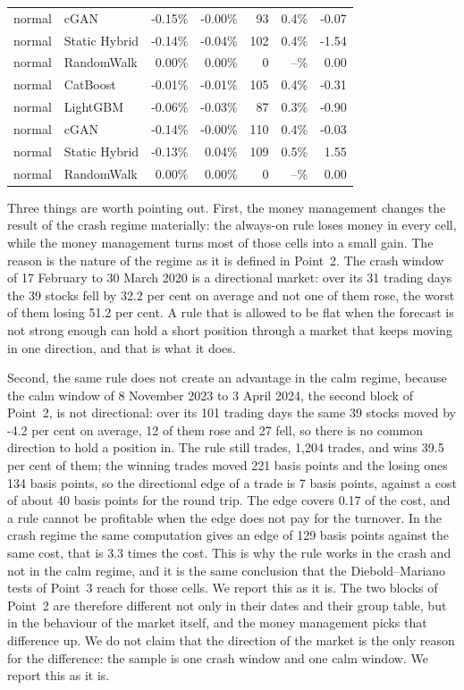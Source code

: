 \documentclass[11pt,a4paper]{article}
\begin{document}
\begin{center}
\begin{longtable}{llrrrrr}
normal & cGAN & -0.15\% & -0.00\% & 93 & 0.4\% & -0.07 \\
normal & Static Hybrid & -0.14\% & -0.04\% & 102 & 0.4\% & -1.54 \\
normal & RandomWalk & 0.00\% & 0.00\% & 0 & --\% & 0.00 \\
normal & CatBoost & -0.01\% & -0.01\% & 105 & 0.4\% & -0.31 \\
normal & LightGBM & -0.06\% & -0.03\% & 87 & 0.3\% & -0.90 \\
normal & cGAN & -0.14\% & -0.00\% & 110 & 0.4\% & -0.03 \\
normal & Static Hybrid & -0.13\% & 0.04\% & 109 & 0.5\% & 1.55 \\
normal & RandomWalk & 0.00\% & 0.00\% & 0 & --\% & 0.00 \\
\bottomrule
\end{longtable}
\end{center}

Three things are worth pointing out. First, the money management changes the
result of the crash regime materially: the always-on rule loses money in
every cell, while the money management turns most of those cells into a
small gain. The reason is the nature of the regime as it is defined in
Point~2. The crash window of 17 February to 30 March 2020 is a directional
market: over its 31 trading days the 39 stocks fell by
32.2 per cent on average and not one of
them rose, the worst of them losing 51.2 per cent.
A rule that is allowed to be flat when the forecast is not strong enough can
hold a short position through a market that keeps moving in one direction,
and that is what it does.

Second, the same rule does not create an advantage in the calm regime,
because the calm window of 8 November 2023 to 3 April 2024, the second
block of Point~2, is not directional:
over its 101 trading days the same 39 stocks moved by
-4.2 per cent on average, 12 of them
rose and 27 fell, so there is no common direction to
hold a position in.
The rule still trades, 1,204 trades, and wins
39.5 per cent of them; the winning trades moved
221 basis points and the losing ones
134 basis points, so the directional edge of a
trade is 7 basis points, against a cost of about
40 basis points for the round trip. The edge covers
0.17 of the cost, and a rule cannot be profitable when
the edge does not pay for the turnover. In the crash regime the same
computation gives an edge of 129 basis points against
the same cost, that is 3.3 times the cost. This is
why the rule works in the crash and not in the calm regime, and it is
the same conclusion that the Diebold--Mariano tests of Point~3 reach for
those cells. We report this as it is.
The two blocks of Point~2 are therefore different not only in
their dates and their group table, but in the behaviour of the market
itself, and the money management picks that difference up. We do not claim
that the direction of the market is the only reason for the difference: the
sample is one crash window and one calm window. We report this as it is.
\end{document}
